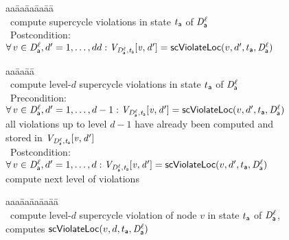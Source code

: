 \begin{figure}[ht]
\setcounter{lctr}{0}
\begin{tabbing}\label{alg:compute-scViol}
aa\= aa\= aa\= aa\= aa\=\kill
{}\\
\cmnt\ compute supercycle violations in state $t_{\mathsf{a}}$ of $\mathit{D}_{\mathsf{a}}^{\ell}$\\
\cmnt\ Postcondition: $\forall\, v \in \mathit{D}_{\mathsf{a}}^{\ell}, d' = 1,\ldots,dd: \mathit{V_{\mathit{D}_{\mathsf{a}}^{\ell},t_{\mathsf{a}}} [v,d']} = \mathsf{scViolateLoc}(v,d',t_{\mathsf{a}},\mathit{D}_{\mathsf{a}}^{\ell})$\\
\lio{\ENDFOR}
\end{tabbing}

\setcounter{lctr}{0}
\begin{tabbing}\label{alg:compute-scViolDist}
aa\= aa\= aa\= \kill
{}\\
\cmnt\ compute level-$d$ supercycle violations in state $t_{\mathsf{a}}$ of $\mathit{D}_{\mathsf{a}}^{\ell}$\\
\cmnt\ Precondition: $\forall\, v \in \mathit{D}_{\mathsf{a}}^{\ell}, d' = 1,\ldots,d-1: \mathit{V_{\mathit{D}_{\mathsf{a}}^{\ell},t_{\mathsf{a}}} [v,d']} = \mathsf{scViolateLoc}(v,d',t_{\mathsf{a}},\mathit{D}_{\mathsf{a}}^{\ell})$\\
\cmnt \ie all violations up to level $d-1$ have already been computed and stored in $\mathit{V_{\mathit{D}_{\mathsf{a}}^{\ell},t_{\mathsf{a}}} [v,d']}$\\
\cmnt\ Postcondition: $\forall\, v \in \mathit{D}_{\mathsf{a}}^{\ell}, d' = 1,\ldots,d:  \mathit{V_{\mathit{D}_{\mathsf{a}}^{\ell},t_{\mathsf{a}}} [v,d']} = \mathsf{scViolateLoc}(v,d',t_{\mathsf{a}},\mathit{D}_{\mathsf{a}}^{\ell})$\\
\cmnt \ie compute next level of violations\\
\lio{\ENDFOR}
\end{tabbing}


\setcounter{lctr}{0}
\begin{tabbing}\label{alg:compute-scViolDist}
aaa\= aa\= aa\= aa\= aa\= \kill
{}\\
\cmnt\ compute level-$d$ supercycle violation of node $v$ in state $t_{\mathsf{a}}$ of $\mathit{D}_{\mathsf{a}}^{\ell}$, \ie computes $\mathsf{scViolateLoc}(v,d,t_{\mathsf{a}},\mathit{D}_{\mathsf{a}}^{\ell})$\\


\end{tabbing}
\end{figure}
